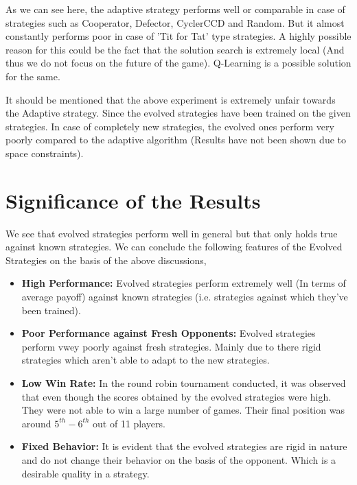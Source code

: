 \documentclass[a4paper]{article}
\begin{document}
	As we can see here, the adaptive strategy performs well or comparable in case of strategies such as Cooperator, Defector, CyclerCCD and Random. But it almost constantly performs poor in case of 'Tit for Tat' type strategies. A highly possible reason for this could be the fact that the solution search is extremely local (And thus we do not focus on the future of the game). Q-Learning \cite{qlearn} is a possible solution for the same.

	It should be mentioned that the above experiment is extremely unfair towards the Adaptive strategy. Since the evolved strategies have been trained on the given strategies. In case of completely new strategies, the evolved ones perform very poorly compared to the adaptive algorithm (Results have not been shown due to space constraints).

	\section{Significance of the Results}
	
	We see that evolved strategies perform well in general but that only holds true against known strategies. We can conclude the following features of the Evolved Strategies on the basis of the above discussions,
	\begin{itemize}
		\item \textbf{High Performance:} Evolved strategies perform extremely well (In terms of average payoff) against known strategies (i.e. strategies against which they've been trained).
		\item \textbf{Poor Performance against Fresh Opponents:} Evolved strategies perform vwey poorly against fresh strategies. Mainly due to there rigid strategies which aren't able to adapt to the new strategies.
		\item \textbf{Low Win Rate:} In the round robin tournament conducted, it was observed that even though the scores obtained by the evolved strategies were high. They were not able to win a large number of games. Their final position was around $5^{th}-6^{th}$ out of 11 players.
		\item \textbf{Fixed Behavior:} It is evident that the evolved strategies are rigid in nature and do not change their behavior on the basis of the opponent. Which is a desirable quality in a strategy.
	\end{itemize}
\end{document}
